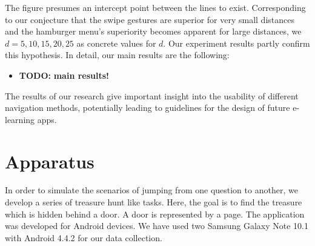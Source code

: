 \documentclass{sig-alternate-05-2015}
\newcommand{\todo}{\textbf{TODO:} \textbf}
\begin{document}
The figure presumes an intercept point between the lines to exist. Corresponding to our conjecture that the swipe gestures are superior for very small distances and the hamburger menu's superiority
becomes apparent for large distances, we $d = 5, 10, 15, 20, 25$ as concrete
values for $d$. Our experiment results partly confirm this hypothesis. In detail, our main results are the following:
\begin{itemize}
  \item \todo{main results!}
\end{itemize}
The results of our research give important insight into the usability of
different navigation methods, potentially leading to guidelines for the design
of future e-learning apps.
\section{Apparatus}
In order to simulate the scenarios of jumping from one question to another, we develop a series of treasure hunt like tasks. Here, the goal is to find the treasure which is hidden behind a door. A door is represented by a page. The application was developed for Android devices. We have used two Samsung Galaxy Note 10.1 with Android 4.4.2 for our data collection.
\end{document}
